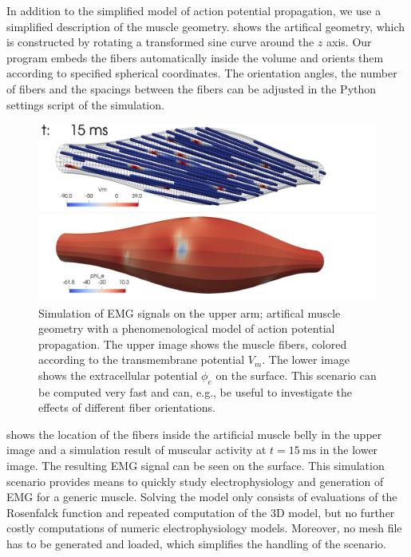 In addition to the simplified model of action potential propagation, we use a simplified description of the muscle geometry.  shows the artifical geometry, which is constructed by rotating a transformed sine curve around the $z$ axis. 
Our program embeds the fibers automatically inside the volume and orients them according to specified spherical coordinates. The orientation angles, the number of fibers and the spacings between the fibers can be adjusted in the Python settings script of the simulation.

\begin{figure}
  \centering%
  \includegraphics[width=\textwidth]{images/results/application/custom_geometry.png}%
  \caption{Simulation of EMG signals on the upper arm; artifical muscle geometry with a phenomenological model of action potential propagation. The upper image shows the muscle fibers, colored according to the transmembrane potential $V_m$. The lower image shows the extracellular potential $\phi_e$ on the surface.
  This scenario can be computed very fast and can, e.g., be useful to investigate the effects of different fiber orientations.}%
  \label{fig:custom_geometry}%
\end{figure}

 shows the location of the fibers inside the artificial muscle belly in the upper image and a simulation result of muscular activity  at $t=\SI{15}{\ms}$ in the lower image. The resulting EMG signal can be seen on the surface.
This simulation scenario provides means to quickly study electrophysiology and generation of EMG for a generic muscle. Solving the model only consists of evaluations of the Rosenfalck function and repeated computation of the 3D model, but no further costly computations of numeric electrophysiology models. Moreover, no mesh file has to be generated and loaded, which simplifies the handling of the scenario.

